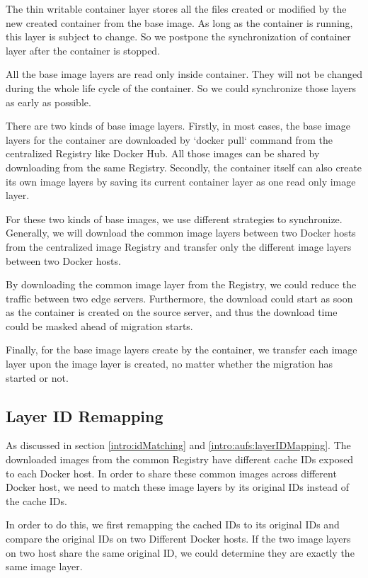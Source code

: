 The thin writable container layer stores all the files created or modified by the new created container from the base image. As long as the container is running, this layer is subject to change. So we postpone the synchronization of container layer after the container is stopped.

All the base image layers are read only inside container. They will not be changed during the whole life cycle of the container. So we could synchronize those layers as early as possible.

There are two kinds of base image layers. Firstly, in most cases, the base image layers for the container are downloaded by `docker pull` command from the centralized Registry like Docker Hub. All those images can be shared by downloading from the same Registry. Secondly, the container itself can also create its own image layers by saving its current container layer as one read only image layer. 

For these two kinds of base images, we use different strategies to synchronize. Generally, we will download the common image layers between two Docker hosts from the centralized image Registry and transfer only the different image layers between two Docker hosts.

By downloading the common image layer from the Registry, we could reduce the traffic between two edge servers. Furthermore, the download could start as soon as the container is created on the source server, and thus the download time could be masked ahead of migration starts.

Finally, for the base image layers create by the container, we transfer each image layer upon the image layer is created, no matter whether the migration has started or not. 

\subsection{Layer ID Remapping} \label{idremapping}

As discussed in section \ref{intro:idMatching} and \ref{intro:aufs:layerIDMapping}. The downloaded images from the common Registry have different cache IDs exposed to each Docker host. In order to share these common images across different Docker host, we need to match these  image layers by its original IDs instead of the cache IDs.

In order to do this, we first remapping the cached IDs to its original IDs and compare the original IDs on two Different Docker hosts. If the two image layers on two host share the same original ID, we could determine they are exactly the same image layer. 

